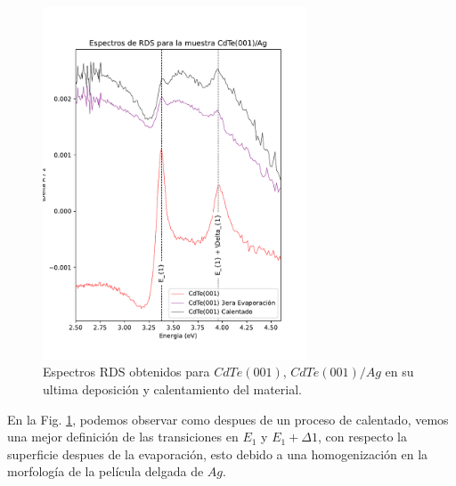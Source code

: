 \begin{figure}[H]
    \centering
    \includegraphics[width=0.7\textwidth]{figures/chap4/cdte-ag/rds-results/ag_rds_2.pdf}
        \caption{Espectros RDS obtenidos para $CdTe(001)$, $CdTe(001)/Ag$ en su ultima deposición y calentamiento del material.}
    \label{fig:cdte-rds-2}
\end{figure}

En la Fig. \ref{fig:cdte-rds-2}, podemos observar como despues de un proceso de calentado, vemos una mejor definición de las transiciones en $E_{1}$ y $E_{1}+\Delta1$, con respecto la superficie despues de la evaporación, esto debido a una homogenización en la morfología de la película delgada de $Ag$.

